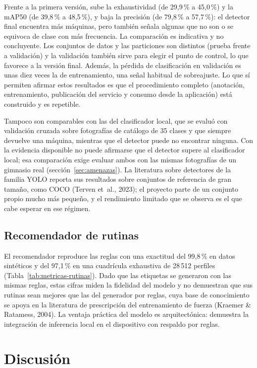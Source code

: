 Frente a la primera versión, sube la exhaustividad (de 29,9\,\% a 45,0\,\%) y la
mAP50 (de 39,8\,\% a 48,5\,\%), y baja la precisión (de 79,8\,\% a 57,7\,\%): el
detector final encuentra más máquinas, pero también señala algunas que no son
o se equivoca de clase con más frecuencia. La comparación es indicativa y no
concluyente. Los conjuntos de datos y las particiones son distintos (prueba
frente a validación) y la validación también sirve para elegir el punto de
control, lo que favorece a la versión final. Además, la pérdida de
clasificación en validación es unas diez veces la de entrenamiento, una señal
habitual de sobreajuste. Lo que sí permiten afirmar estos resultados es que el
procedimiento completo (anotación, entrenamiento, publicación del servicio y
consumo desde la aplicación) está construido y es repetible.

Tampoco son comparables con las del clasificador local, que se evaluó con
validación cruzada sobre fotografías de catálogo de 35 clases y que siempre
devuelve una máquina, mientras que el detector puede no encontrar ninguna. Con
la evidencia disponible no puede afirmarse que el detector supere al
clasificador local; esa comparación exige evaluar ambos con las mismas
fotografías de un gimnasio real (sección~\ref{sec:amenazas}). La literatura
sobre detectores de la familia YOLO reporta sus resultados sobre conjuntos de
referencia de gran tamaño, como COCO (Terven et~al., 2023); el proyecto parte de
un conjunto propio mucho más pequeño, y el rendimiento limitado que se observa
es el que cabe esperar en ese régimen.

\subsection{Recomendador de rutinas}

El recomendador reproduce las reglas con una exactitud del 99,8\,\% en datos
sintéticos y del 97,1\,\% en una cuadrícula exhaustiva de 28\,512 perfiles
(Tabla~\ref{tab:metricas-rutinas}). Dado que las etiquetas se generaron con las
mismas reglas, estas cifras miden la fidelidad del modelo y no demuestran que
sus rutinas sean mejores que las del generador por reglas, cuya base de
conocimiento se apoya en la literatura de prescripción del entrenamiento de
fuerza (Kraemer \& Ratamess, 2004). La ventaja práctica del modelo es
arquitectónica: demuestra la integración de inferencia local en el
dispositivo con respaldo por reglas.

\section{Discusión}
\label{sec:discusion}

